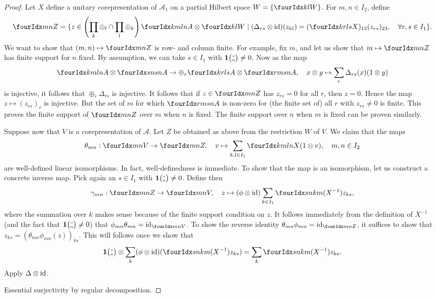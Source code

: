 \begin{proof}
Let $X$ define a unitary corepresentation of $\mathscr{A}_1$ on a partial Hilbert space $W= \{\Gru{W}{k}{l}\}$. For $m,n\in I_{2}$, define \[\Gru{Z}{m}{n} = \{z \in \left(\prod_k\oplus_l\cap \prod_l\oplus_k\right) \Gr{A}{k}{l}{m}{n}\otimes \Gru{W}{k}{l}\mid (\Delta_{rs}\otimes \id)(z_{kl}) = (\Gr{X}{k}{l}{r}{s})_{13}(z_{rs})_{23},\quad \forall r,s\in I_1\}.\] We want to show that $(m,n)\mapsto \Gru{Z}{m}{n}$ is row- and column finite. For example, fix $m$, and let us show that $m \mapsto \Gru{Z}{m}{n}$ has finite support for $n$ fixed. By assumption, we can take $s\in I_1$ with $\mathbf{1}{\tiny {\begin{pmatrix} s\\n\end{pmatrix}}}\neq 0$. Now as the map \[ \Gr{A}{k}{l}{m}{n}\otimes \Gr{A}{s}{s}{n}{n} \rightarrow \oplus_r \Gr{A}{k}{l}{r}{s}\otimes \Gr{A}{r}{s}{m}{n},\quad x\otimes y \mapsto \sum_r \Delta_{rs}(x)(1\otimes y)\] is injective, it follows that $\oplus_r\Delta_{rs}$ is injective. It follows that if $z \in \Gru{Z}{m}{n}$ has $z_{rs}=0$ for all $r$, then $z=0$. Hence the map $z\mapsto (z_{rs})_r$ is injective. But the set of $m$ for which $\Gr{A}{r}{s}{m}{n}$ is non-zero for (the finite set of) all $r$ with $z_{rs}\neq 0$ is finite. This proves the finite support of $\Gru{Z}{m}{n}$ over $m$ when $n$ is fixed. The finite support over $n$ when $m$ is fixed can be proven similarly. 

Suppose now that $V$ is a corepresentation of $\mathscr{A}$. Let $Z$ be obtained as above from the restriction $W$ of $V$. We claim that the maps \[\theta_{mn}:\Gru{V}{m}{n}\rightarrow \Gru{Z}{m}{n},\quad v \mapsto \sum_{k,l\in I_1} \Gr{X}{k}{l}{m}{n}(1\otimes v),\quad m,n\in I_2\]  are well-defined linear isomorphisms. In fact, well-definedness is immediate. To show that the map is an isomorphism, let us construct a concrete inverse map. Pick again an $s\in I_1$ with $\mathbf{1}{\tiny {\begin{pmatrix} s\\n\end{pmatrix}}}\neq 0$. Define then \[\gamma_{mn}:\Gru{Z}{m}{n} \rightarrow \Gru{V}{m}{n},\quad z \mapsto (\phi\otimes \id)\sum_{k\in I_1} \Gr{(X^{-1})}{s}{k}{n}{m}z_{ks},\] where the summation over $k$ makes sense because of the finite support condition on $z$. It follows immediately from the definition of $X^{-1}$ (and the fact that $\mathbf{1}{\tiny {\begin{pmatrix} s\\n\end{pmatrix}}}\neq 0$) that $\phi_{mn}\theta_{mn} = \id_{\Gru{V}{m}{n}}$. To show the reverse identity $\theta_{mn}\phi_{mn} = \id_{\Gru{Z}{m}{n}}$, it suffices to show that $z_{ks} = (\theta_{mn}\phi_{mn}(z))_{ks}$. This will follows once we show that \[\UnitC{s}{n}\otimes \sum_k (\phi\otimes \id)(\Gr{(X^{-1})}{s}{k}{n}{m}z_{ks}) = \sum_k \Gr{(X^{-1})}{s}{k}{n}{m}z_{ks}.\] Apply $\Delta\otimes \operatorname{id}$. 




Essential surjectivity by regular decomposition.
\end{proof}



